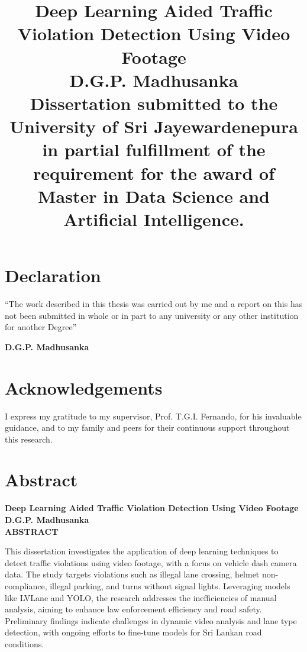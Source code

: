 \documentclass[12pt,a4paper]{article}
\title{
    \vspace{2cm}
    \textbf{Deep Learning Aided Traffic Violation Detection Using Video Footage} \\
    \vspace{4cm}
    \large{D.G.P. Madhusanka} \\
    \vspace{4cm}
    \normalsize{Dissertation submitted to the University of Sri Jayewardenepura in partial fulfillment of the requirement for the award of Master in Data Science and Artificial Intelligence.}
}
\author{}
\date{}
\begin{document}
\maketitle
\thispagestyle{empty}
\newpage

\section*{Declaration}
\vspace{1cm}
``The work described in this thesis was carried out by me and a report on this has not been submitted in whole or in part to any university or any other institution for another Degree''

\vspace{2cm}
\textbf{D.G.P. Madhusanka}
\thispagestyle{empty}
\newpage

\setcounter{page}{1}
\renewcommand{\thepage}{\roman{page}}

\tableofcontents
\newpage

\listoftables
\listoffigures
\newpage

\section*{Acknowledgements}
I express my gratitude to my supervisor, Prof. T.G.I. Fernando, for his invaluable guidance, and to my family and peers for their continuous support throughout this research.
\newpage

\section*{Abstract}
\begin{center}
    \fontsize{14}{16}\selectfont \textbf{Deep Learning Aided Traffic Violation Detection Using Video Footage} \\
    \vspace{0.5cm}
    \fontsize{14}{16}\selectfont \textbf{D.G.P. Madhusanka} \\
    \vspace{0.5cm}
    \fontsize{14}{16}\selectfont \textbf{ABSTRACT}
\end{center}
\vspace{1cm}
\normalsize
This dissertation investigates the application of deep learning techniques to detect traffic violations using video footage, with a focus on vehicle dash camera data. The study targets violations such as illegal lane crossing, helmet non-compliance, illegal parking, and turns without signal lights. Leveraging models like LVLane and YOLO, the research addresses the inefficiencies of manual analysis, aiming to enhance law enforcement efficiency and road safety. Preliminary findings indicate challenges in dynamic video analysis and lane type detection, with ongoing efforts to fine-tune models for Sri Lankan road conditions.
\newpage
\end{document}
